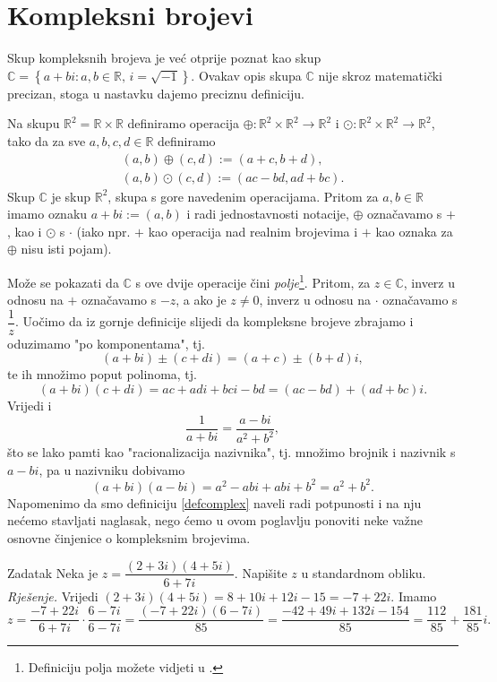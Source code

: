 \section{Kompleksni brojevi}
Skup kompleksnih brojeva je već otprije poznat kao skup \(\mathbb{C}=\left\{a+bi : a, b\in \mathbb{R},\, i=\sqrt{-1}\right\}\). Ovakav opis skupa $\mathbb{C}$ nije skroz matematički precizan, stoga u nastavku dajemo preciznu definiciju.
\begin{definition}
\label{defcomplex}
Na skupu $\mathbb{R}^2=\mathbb{R}\times\mathbb{R}$ definiramo operacija $\oplus : \mathbb{R}^2\times \mathbb{R}^2\to \mathbb{R}^2$ i $\odot : \mathbb{R}^2\times \mathbb{R}^2\to \mathbb{R}^2$, tako da za sve $a, b, c, d\in \mathbb{R}$ definiramo
\begin{gather}
(a, b)\oplus (c, d) := (a+c, b+d),\\
(a, b)\odot (c, d) := (ac-bd, ad+bc).
\end{gather}
Skup $\mathbb{C}$ je skup $\mathbb{R}^2$, skupa s gore navedenim operacijama. Pritom za $a, b\in \mathbb{R}$ imamo oznaku $a+bi:=(a, b)$ i radi jednostavnosti notacije, $\oplus$ označavamo s $+$, kao i $\odot$ s $\cdot$ (iako npr. $+$ kao operacija nad realnim brojevima i $+$ kao oznaka za $\oplus$ nisu isti pojam).
\end{definition}
Može se pokazati da $\mathbb{C}$ s ove dvije operacije čini \textit{polje}\footnote{Definiciju polja možete vidjeti u \cite{2}.}. Pritom, za $z\in \mathbb{C}$, inverz u odnosu na $+$ označavamo s $-z$, a ako je $z\neq 0$, inverz u odnosu na $\cdot$ označavamo s $\dfrac{1}{z}$.
Uočimo da iz gornje definicije slijedi da kompleksne brojeve zbrajamo i oduzimamo "po komponentama", tj. \[(a+bi)\pm (c+di)=(a+c)\pm (b+d)i,\] te ih množimo poput polinoma, tj. \[(a+bi)(c+di)=ac+adi+bci-bd=(ac-bd)+(ad+bc)i.\] Vrijedi i \[\dfrac{1}{a+bi}=\dfrac{a-bi}{a^2+b^2},\] što se lako pamti kao "racionalizacija nazivnika", tj. množimo brojnik i nazivnik s \(a-bi\), pa u nazivniku dobivamo \[(a+bi)(a-bi)=a^2-abi+abi+b^2=a^2+b^2.\]
Napomenimo da smo definiciju \ref{defcomplex} naveli radi potpunosti i na nju nećemo stavljati naglasak, nego ćemo u ovom poglavlju ponoviti neke važne osnovne činjenice o kompleksnim brojevima. 
\begin{exercise}{Zadatak}
Neka je \(z=\dfrac{(2+3i)(4+5i)}{6+7i}\). Napišite \(z\) u standardnom obliku.\\
\textit{Rješenje.} Vrijedi \((2+3i)(4+5i)=8+10i+12i-15=-7+22i\). Imamo
\[z=\dfrac{-7+22i}{6+7i}\cdot \dfrac{6-7i}{6-7i}=\dfrac{(-7+22i)(6-7i)}{85}=\dfrac{-42+49i+132i-154}{85}=\dfrac{112}{85}+\dfrac{181}{85}i.\]
\end{exercise}
